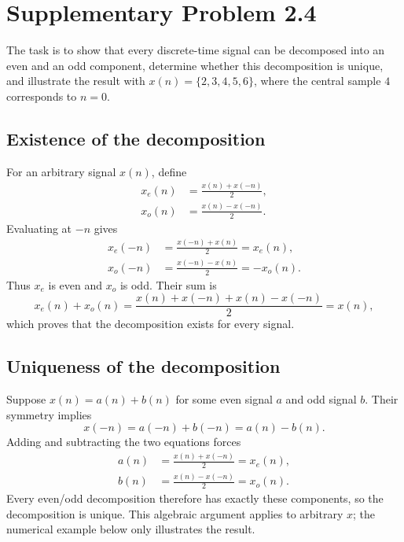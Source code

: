 \section{Supplementary Problem 2.4}
The task is to show that every discrete-time signal can be decomposed
into an even and an odd component, determine whether this decomposition
is unique, and illustrate the result with $x(n)=\{2,3,4,5,6\}$, where
the central sample $4$ corresponds to $n=0$.

\subsection{Existence of the decomposition}
For an arbitrary signal $x(n)$, define
\begin{align}
  x_e(n)&=\frac{x(n)+x(-n)}{2},\\
  x_o(n)&=\frac{x(n)-x(-n)}{2}.
\end{align}
Evaluating at $-n$ gives
\begin{align}
  x_e(-n)&=\frac{x(-n)+x(n)}{2}=x_e(n),\\
  x_o(-n)&=\frac{x(-n)-x(n)}{2}=-x_o(n).
\end{align}
Thus $x_e$ is even and $x_o$ is odd. Their sum is
\begin{equation}
  x_e(n)+x_o(n)
  =\frac{x(n)+x(-n)+x(n)-x(-n)}{2}=x(n),
\end{equation}
which proves that the decomposition exists for every signal.

\subsection{Uniqueness of the decomposition}
Suppose $x(n)=a(n)+b(n)$ for some even signal $a$ and odd signal $b$.
Their symmetry implies
\begin{equation}
  x(-n)=a(-n)+b(-n)=a(n)-b(n).
\end{equation}
Adding and subtracting the two equations forces
\begin{align}
  a(n)&=\frac{x(n)+x(-n)}{2}=x_e(n),\\
  b(n)&=\frac{x(n)-x(-n)}{2}=x_o(n).
\end{align}
Every even/odd decomposition therefore has exactly these components,
so the decomposition is unique. This algebraic argument applies to
arbitrary $x$; the numerical example below only illustrates the result.

